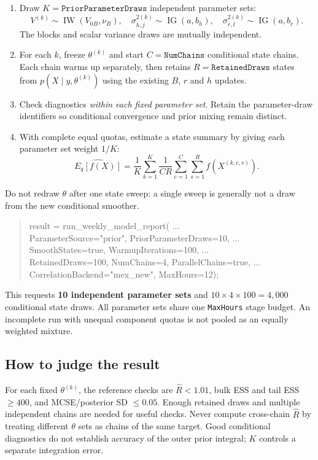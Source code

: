 \documentclass[10pt,a4paper]{article}
\newcommand{\IG}{\operatorname{IG}}
\newcommand{\IW}{\operatorname{IW}}
\newcommand{\code}[1]{\texttt{#1}}
\begin{document}
\begin{enumerate}
\item Draw $K=\code{PriorParameterDraws}$ independent parameter sets:
\[
V^{(k)}\sim\IW(V_{0B},\nu_B),\quad
\sigma_{h,j}^{2(k)}\sim\IG(a,b_h),\quad
\sigma_{r,l}^{2(k)}\sim\IG(a,b_r).
\]
The blocks and scalar variance draws are mutually independent.
\item For each $k$, freeze $\theta^{(k)}$ and start
$C=\code{NumChains}$ conditional state chains. Each chain warms up separately,
then retains $R=\code{RetainedDraws}$ states from
$p(X\mid y,\theta^{(k)})$ using the existing $B$, $r$ and $h$ updates.
\item Check diagnostics \emph{within each fixed parameter set}. Retain the
parameter-draw identifiers so conditional convergence and prior mixing
remain distinct.
\item With complete equal quotas, estimate a state summary by giving each
parameter set weight $1/K$:
\[
\widehat{E_q[f(X)]}=\frac1K\sum_{k=1}^{K}
\frac1{CR}\sum_{c=1}^{C}\sum_{s=1}^{R}f(X^{(k,c,s)}).
\]
\end{enumerate}
Do not redraw $\theta$ after one state sweep: a single sweep is generally not
a draw from the new conditional smoother.

\begin{quote}\small\ttfamily
result = run\_weekly\_model\_report( ...\\
\hspace*{3mm}ParameterSource="prior", PriorParameterDraws=10, ...\\
\hspace*{3mm}SmoothStates=true, WarmupIterations=100, ...\\
\hspace*{3mm}RetainedDraws=100, NumChains=4, ParallelChains=true, ...\\
\hspace*{3mm}CorrelationBackend="mex\_new", MaxHours=12);
\end{quote}
This requests \textbf{10 independent parameter sets} and
$10\times4\times100=4{,}000$ conditional state draws. All parameter sets
share one \code{MaxHours} stage budget. An incomplete run with unequal
component quotas is not pooled as an equally weighted mixture.

\subsection*{How to judge the result}
For each fixed $\theta^{(k)}$, the reference checks are
$\widehat R<1.01$, bulk ESS and tail ESS $\geq400$, and
MCSE/posterior SD $\leq0.05$. Enough retained draws and multiple independent
chains are needed for useful checks. Never compute cross-chain $\widehat R$
by treating different $\theta$ sets as chains of the same target. Good
conditional diagnostics do not establish accuracy of the outer prior
integral; $K$ controls a separate integration error.
\end{document}

